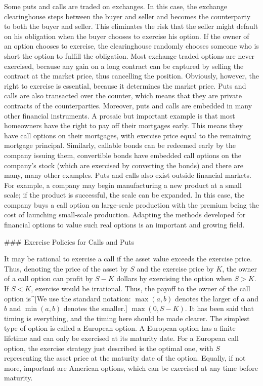 Some puts and calls are traded on exchanges.  In this case, the exchange clearinghouse steps between the buyer and seller and becomes the counterparty to both the buyer and seller.  This eliminates the risk that the seller might default on his obligation when the buyer chooses to exercise his option.  If the owner of an option chooses to exercise, the clearinghouse randomly chooses someone who is short the option to fulfill the obligation.  Most exchange traded options are never exercised, because any gain on a long contract can be captured by selling the contract at the market price, thus cancelling the position.  Obviously, however, the right to exercise is essential, because it determines the market price.  Puts and calls are also transacted over the counter,  which means that they are private contracts of the counterparties.  Moreover, puts and calls are embedded in many other financial instruments.  A prosaic but important example is that most homeowners have the right to pay off their mortgages early.  This means they have call options on their mortgages, with exercise price equal to the remaining mortgage principal.  Similarly, callable bonds can be redeemed early by the company issuing them, convertible bonds have  embedded call options on the company's stock (which are exercised by converting the bonds) and there are many, many other examples.  Puts and calls also exist outside financial markets.  For example, a company may begin manufacturing a new product at a small scale; if the product is successful, the scale can be expanded.  In this case, the company buys a call option on large-scale production with the premium being the cost of launching small-scale production.  Adapting the methods developed for financial options to value such real options is an important and growing field. 

### Exercise Policies for Calls and Puts

It may be rational to exercise a call if the asset value exceeds the exercise price.  Thus, denoting the price of the asset by $S$ and the exercise price by $K$, the owner of a call option can profit by $S-K$ dollars by exercising the option when $S>K$.  If $S<K$, exercise would be irrational.  Thus, the payoff to the owner of the call option is^[We use the standard notation:  $\max(a,b)$ denotes the larger of $a$ and $b$ and $\min(a,b)$ denotes the smaller.] $\max(0,S-K)$.  It has been said that timing is everything, and the timing here should be made clearer.  The simplest type of option is called a European option.   A European option has a finite lifetime and can only be exercised at its maturity date.  For a European call option, the exercise strategy just described is the optimal one, with $S$ representing the asset price at the maturity date of the option.  Equally, if not more, important are American options,  which can be exercised at any time before maturity.   

